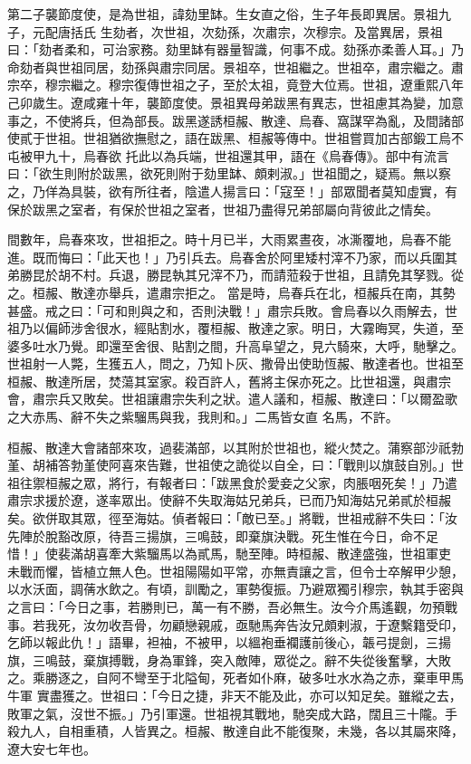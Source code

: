 \begin{pinyinscope}
 第二子襲節度使，是為世祖，諱劾里缽。生女直之俗，生子年長即異居。景祖九子，元配唐括氏
 生劾者，次世祖，次劾孫，次肅宗，次穆宗。及當異居，景祖曰：「劾者柔和，可治家務。劾里缽有器量智識，何事不成。劾孫亦柔善人耳。」乃命劾者與世祖同居，劾孫與肅宗同居。景祖卒，世祖繼之。世祖卒，肅宗繼之。肅宗卒，穆宗繼之。穆宗復傳世祖之子，至於太祖，竟登大位焉。世祖，遼重熙八年己卯歲生。遼咸雍十年，襲節度使。景祖異母弟跋黑有異志，世祖慮其為變，加意事之，不使將兵，但為部長。跋黑遂誘桓赧、散達、烏春、窩謀罕為亂，及間諸部使貳于世祖。世祖猶欲撫慰之，語在跋黑、桓赧等傳中。世祖嘗買加古部鍛工烏不屯被甲九十，烏春欲
 托此以為兵端，世祖還其甲，語在《烏春傳》。部中有流言曰：「欲生則附於跋黑，欲死則附于劾里缽、頗剌淑。」世祖聞之，疑焉。無以察之，乃佯為具裝，欲有所往者，陰遣人揚言曰：「寇至！」部眾聞者莫知虛實，有保於跋黑之室者，有保於世祖之室者，世祖乃盡得兄弟部屬向背彼此之情矣。



 間數年，烏春來攻，世祖拒之。時十月已半，大雨累晝夜，冰澌覆地，烏春不能進。既而悔曰：「此天也！」乃引兵去。烏春舍於阿里矮村滓不乃家，而以兵圍其弟勝昆於胡不村。兵退，勝昆執其兄滓不乃，而請蒞殺于世祖，且請免其孥戮。從之。桓赧、散達亦舉兵，遣肅宗拒之。
 當是時，烏春兵在北，桓赧兵在南，其勢甚盛。戒之曰：「可和則與之和，否則決戰！」肅宗兵敗。會烏春以久雨解去，世祖乃以偏師涉舍很水，經貼割水，覆桓赧、散達之家。明日，大霧晦冥，失道，至婆多吐水乃覺。即還至舍很、貼割之間，升高阜望之，見六騎來，大呼，馳擊之。世祖射一人斃，生獲五人，問之，乃知卜灰、撒骨出使助恆赧、散達者也。世祖至桓赧、散達所居，焚蕩其室家。殺百許人，舊將主保亦死之。比世祖還，與肅宗會，肅宗兵又敗矣。世祖讓肅宗失利之狀。遣人議和，桓赧、散達曰：「以爾盈歌之大赤馬、辭不失之紫騮馬與我，我則和。」二馬皆女直
 名馬，不許。



 桓赧、散達大會諸部來攻，過裴滿部，以其附於世祖也，縱火焚之。蒲察部沙祇勃堇、胡補答勃堇使阿喜來告難，世祖使之詭從以自全，曰：「戰則以旗鼓自別。」世祖往禦桓赧之眾，將行，有報者曰：「跋黑食於愛妾之父家，肉脹咽死矣！」乃遣肅宗求援於遼，遂率眾出。使辭不失取海姑兄弟兵，已而乃知海姑兄弟貳於桓赧矣。欲併取其眾，徑至海姑。偵者報曰：「敵已至。」將戰，世祖戒辭不失曰：「汝先陣於脫豁改原，待吾三揚旗，三鳴鼓，即棄旗決戰。死生惟在今日，命不足惜！」使裴滿胡喜牽大紫騮馬以為貳馬，馳至陣。時桓赧、散達盛強，世祖軍吏
 未戰而懼，皆植立無人色。世祖陽陽如平常，亦無責讓之言，但令士卒解甲少憩，以水沃面，調蒨水飲之。有頃，訓勵之，軍勢復振。乃避眾獨引穆宗，執其手密與之言曰：「今日之事，若勝則已，萬一有不勝，吾必無生。汝今介馬遙觀，勿預戰事。若我死，汝勿收吾骨，勿顧戀親戚，亟馳馬奔告汝兄頗剌淑，于遼繫籍受印，乞師以報此仇！」語畢，袒袖，不被甲，以縕袍垂襴護前後心，韔弓提劍，三揚旗，三鳴鼓，棄旗搏戰，身為軍鋒，突入敵陣，眾從之。辭不失從後奮擊，大敗之。乘勝逐之，自阿不彎至于北隘甸，死者如仆麻，破多吐水水為之赤，棄車甲馬牛軍
 實盡獲之。世祖曰：「今日之捷，非天不能及此，亦可以知足矣。雖縱之去，敗軍之氣，沒世不振。」乃引軍還。世祖視其戰地，馳突成大路，闊且三十隴。手殺九人，自相重積，人皆異之。桓赧、散達自此不能復聚，未幾，各以其屬來降，遼大安七年也。




\end{pinyinscope}
